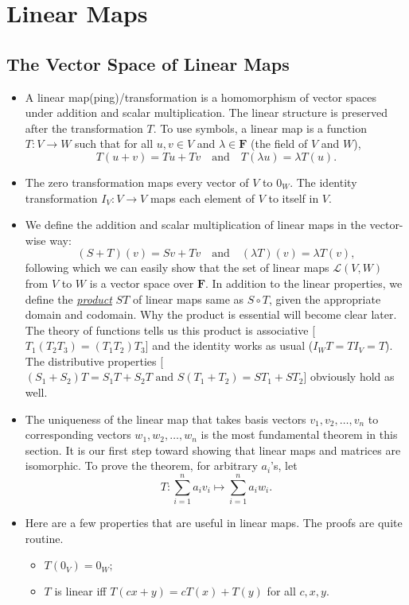 \documentclass[11pt]{article}
\newcommand{\df}[1]{\ul{\textit{\textsf{#1}}}}
\newcommand{\F}{\mathbf{F}}
\begin{document}
\newpage
\section{Linear Maps}
\subsection{The Vector Space of Linear Maps}
\begin{itemize}
    \item A linear map(ping)/transformation is a homomorphism of vector spaces under addition and scalar multiplication. The linear structure is preserved after the transformation $T$. To use symbols, a linear map is a function $T: V \rightarrow W$ such that for all $u,v \in V$ and $\lambda \in \F$ (the field of $V$ and $W$),
    \begin{equation*}
        T(u+v) = Tu + Tv \quad \text{and} \quad
        T (\lambda u) = \lambda T(u).
    \end{equation*}
    \item The zero transformation maps every vector of $V$ to $0_W$. The identity transformation $I_V: V \rightarrow V$ maps each element of $V$ to itself in $V$.
    \item We define the addition and scalar multiplication of linear maps in the vector-wise way: $$(S+T)(v) = Sv + Tv \quad \text{and} \quad (\lambda T)(v) = \lambda T(v),$$ following which we can easily show that the set of linear maps $\mathcal{L}(V,W)$ from $V$ to $W$ is a vector space over $\F$. In addition to the linear properties, we define the \df{product} $ST$ of linear maps same as $S \circ T$, given the appropriate domain and codomain. Why the product is essential will become clear later. The theory of functions tells us this product is associative [$T_1(T_2 T_3) = (T_1 T_2) T_3$] and the identity works as usual ($I_W T = T I_V = T$). The distributive properties [$(S_1 + S_2) T = S_1 T + S_2 T \text{ and } S(T_1 + T_2) = S T_1 + S T_2$] obviously hold as well.
    \item The uniqueness of the linear map that takes basis vectors $v_1, v_2, \dots, v_n$ to corresponding vectors $w_1, w_2, \dots, w_n$ is the most fundamental theorem in this section. It is our first step toward showing that linear maps and matrices are isomorphic. To prove the theorem, for arbitrary $a_i$'s, let $$T: \sum_{i=1}^n a_i v_i \mapsto \sum_{i=1}^n a_i w_i.$$
    \item Here are a few properties that are useful in linear maps. The proofs are quite routine.
    \begin{itemize}
        \item $T(0_V) = 0_W;$
        \item $T$ is linear iff $T(cx+y) = cT(x) + T(y)$ for all $c,x,y.$
    \end{itemize}
\end{itemize}
\end{document}
